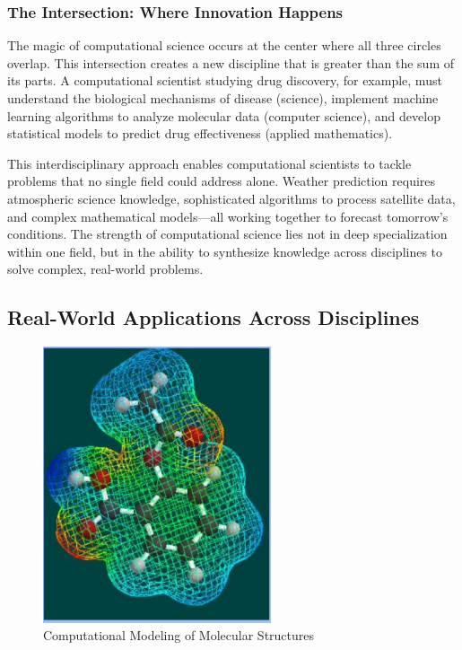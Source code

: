 \subsubsection{The Intersection: Where Innovation Happens}

The magic of computational science occurs at the center where all three circles overlap. This intersection creates a new discipline that is greater than the sum of its parts. A computational scientist studying drug discovery, for example, must understand the biological mechanisms of disease (science), implement machine learning algorithms to analyze molecular data (computer science), and develop statistical models to predict drug effectiveness (applied mathematics).

This interdisciplinary approach enables computational scientists to tackle problems that no single field could address alone. Weather prediction requires atmospheric science knowledge, sophisticated algorithms to process satellite data, and complex mathematical models—all working together to forecast tomorrow's conditions. The strength of computational science lies not in deep specialization within one field, but in the ability to synthesize knowledge across disciplines to solve complex, real-world problems.

\subsection{Real-World Applications Across Disciplines}

\begin{figure}[h]
 \centering
 \includegraphics[width=0.6\textwidth]{images/molecular_structure.png}
 \caption{Computational Modeling of Molecular Structures}
 \label{fig:molecular_structure}
\end{figure}

